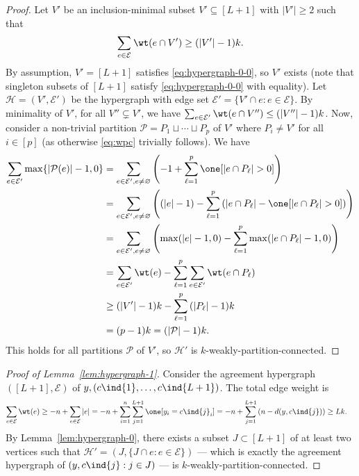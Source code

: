 \documentclass{article}[11pt]
\begin{document}
\begin{proof}
    Let $V'$ be an inclusion-minimal subset $V'\subseteq[L+1]$ with $|V'|\ge 2$ such that 
    \begin{align}
        \sum_{e\in\mathcal{E}}{^{} \wt(e\cap V')} \ge (|V'|-1)k.
        \label{eq:hypergraph-0-0}
    \end{align}
By assumption, $V'=[L+1]$ satisfies \eqref{eq:hypergraph-0-0}, so $V'$ exists (note that singleton subsets of $[L+1]$ satisfy \eqref{eq:hypergraph-0-0} with equality).
Let $\mathcal{H}=(V',\mathcal{E}')$ be the hypergraph with edge set $\mathcal{E}'=\{V'\cap e: e\in\mathcal{E}\}$.
By minimality of $V'$, for all $V''\subsetneq V'$, we have $\sum_{e\in\mathcal{E}'}{\wt(e\cap V'')} \le (|V''|-1)k$.
Now, consider a non-trivial partition $\mathcal{P}=P_1\sqcup\cdots\sqcup P_p$ of $V'$ where $P_i \neq V'$ for all $i \in [p]$ (as otherwise \eqref{eq:wpc} trivially follows). We have
\begin{align}
  \sum_{e\in\mathcal{E}'}{\max\{|\mathcal{P}(e)|-1, 0\}}
  &= \sum_{e\in\mathcal{E}', e \neq \varnothing}{\left(-1 + \sum_{\ell=1}^p{\one[|e \cap P_\ell| > 0]}\right)} \nonumber \\
  &= \sum_{e\in\mathcal{E}', e \neq \varnothing}{\left((|e| - 1) - \sum_{\ell=1}^p{\left(|e \cap P_\ell| - \one[|e \cap P_\ell| > 0]\right)}\right)} \nonumber \\
  &=\sum_{e\in\mathcal{E}', e \neq \varnothing}{\left( \max(|e|-1,0) -\sum_{\ell=1}^{p}{\max(|e\cap P_{\ell}|-1,0)} \right)} \nonumber \\
  &=\sum_{e\in\mathcal{E}'}{\wt(e)} - \sum_{\ell=1}^p{\sum_{e\in\mathcal{E}'}{\wt(e\cap P_{\ell})}} \nonumber \\
  &\ge (|V'|-1)k - \sum_{\ell=1}^p{(|P_{\ell}|-1)k} \nonumber \\
  &= (p-1)k = (|\mathcal{P}|-1)k.
  \label{}
\end{align}
This holds for all partitions $\mathcal{P}$ of $V'$, so $\mathcal{H}'$ is $k$-weakly-partition-connected.
\end{proof}
\begin{proof}[Proof of Lemma~\ref{lem:hypergraph-1}]
  Consider the agreement hypergraph $([L+1],\mathcal{E})$ of $y,(c\ind{1},\dots,c\ind{L+1})$.
The total edge weight is
\begin{align}
  \sum_{e\in \mathcal{E}}{\wt(e)}
  &\ge -n + \sum_{e\in \mathcal{E}}{|e|}
  = -n + \sum_{i=1}^{n}{\sum_{j=1}^{L+1}{\one[y_i = c\ind{j}_i]}}
   = -n + \sum_{j=1}^{L+1}{(n-d(y,c\ind{j}))}
   \ge Lk.
   \label{eq:hyper-1-1}
\end{align}
   By Lemma~\ref{lem:hypergraph-0}, there exists a subset $J\subset [L+1]$ of at least two vertices such that $\mathcal{H}'=(J, \{J\cap e: e\in\mathcal{E}\})$ --- which is exactly the agreement hypergraph of $(y,c\ind{j}:j\in J)$ --- is $k$-weakly-partition-connected.
\end{proof}
\end{document}
